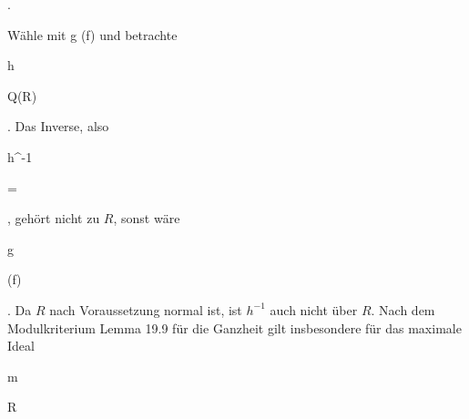 { { . }


Wähle   {  mit  }  { g \not\in (f)   }{ } und betrachte


\mavergleichskettedisp

{\vergleichskette

{h
}

{ } {
}

{ \in} { Q(R)
}

{ } {
}

{ } {
}

}
{}{}{}
 {} {.}
Das Inverse, also


\mavergleichskette

{\vergleichskette

{ h^{-1}
}

{ = }{
}

{  }{
}

{    }{
}

{   }{
}

}
{}{}{,}
gehört nicht zu $R$, sonst wäre


\mavergleichskette

{\vergleichskette

{g
}

{ \in }{(f)
}

{  }{
}

{    }{
}

{   }{
}

}
{}{}{.}
Da $R$ nach Voraussetzung normal ist, ist $h^{-1}$ auch nicht
über $R$. Nach dem Modulkriterium
Lemma 19.9
für die Ganzheit gilt insbesondere für das maximale Ideal


\mavergleichskette

{\vergleichskette

{ {\mathfrak m}
}

{ \subset }{ R
}

{  }{
}

{    }{
}

}}
